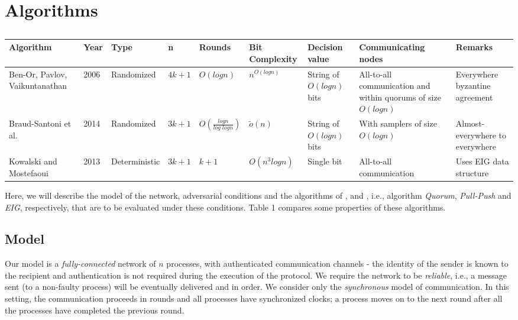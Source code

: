 ﻿\section{Algorithms}
\label{sec:algos}

\begin{table*}[t]
    \vspace{-5mm}
    \caption{}
    \vspace{-2mm}
    \begin{tabular}{p{2cm}llllllp{2.5cm}p{2cm}}
\hline
\textbf{Algorithm} & \textbf{Year} & \textbf{Type} &\textbf{n} & \textbf{Rounds} & \textbf{Bit Complexity } &\textbf{Decision value} & \textbf{Communicating nodes}& \textbf{Remarks} \\ \hline
Ben-Or, Pavlov, Vaikuntanathan \cite{BPV06} & 2006 & Randomized & $4k + 1$ & $O(logn)$ & $n^{O(logn)}$      &String of $O(logn)$ bits &All-to-all communication and within quorums of size $O(logn)$   & Everywhere byzantine agreement     \\
          Braud-Santoni et al. \cite{BGH13} & 2014 & Randomized & $3k + 1$ & $O(\frac{logn}{log\; log n})$ & $\tilde{o}(n)$      &String of $O(logn)$ bits &With samplers of size $O(logn)$  & Almost-everywhere to everywhere     \\
 Kowalski and Mostefaoui \cite{KM13} & 2013   & Deterministic & $3k + 1$     & $k + 1$                     & $O(n^3logn)$ &Single bit  &All-to-all communication & Uses EIG data structure\\ \hline
%
\end{tabular}
\vspace{-2mm}
\end{table*}

Here, we will describe the model of the network, adversarial conditions and the algorithms of \cite{BPV06}, \cite{BGH13} and \cite{KM13}, i.e., algorithm \textit{Quorum}, \textit{Pull-Push} and \textit{EIG}, respectively, that are to be evaluated under these conditions. Table 1 compares some properties of these algorithms.


\subsection{Model}
Our model is a \textit{fully-connected} network of $n$ processes, with authenticated communication channels - the identity of the sender is known to the recipient and authentication is not required during the execution of the protocol. We require the network to be \textit{reliable}, i.e., a message sent (to a non-faulty process) will be eventually delivered and in order. We consider only the \textit{synchronous} model of communication. In this setting, the communication proceeds in rounds and all processes have synchronized clocks; a process moves on to the next round after all the processes have completed the previous round. %

